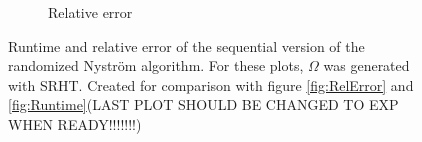 \documentclass{article}
\theoremstyle{definition}
\begin{document}
\begin{appendices}
\begin{figure}
\begin{subfigure}[t]{0.35\textwidth}
    \caption{Relative error}
\end{subfigure}\hfill
\caption{Runtime and relative error of the sequential version of the randomized Nyström algorithm. For these plots, $\Omega$ was generated with SRHT. Created for comparison with figure \ref{fig:RelError} and \ref{fig:Runtime}(LAST PLOT SHOULD BE CHANGED TO EXP WHEN READY!!!!!!!)}
\label{fig:SequentialPerformance}
\end{figure}
\end{appendices}
\end{document}
